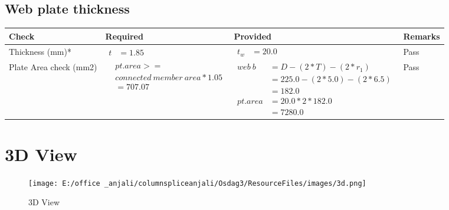 \documentclass{article}%
\begin{document}
\subsection{Web plate thickness}%
\label{subsec:Webplatethickness}%
\renewcommand{\arraystretch}{1.2}%
\begin{longtable}{|p{2.5cm}|p{4.5cm}|p{7cm}|p{1.5cm}|}%
\hline%
\rowcolor{OsdagGreen}%
Check&Required&Provided&Remarks\\%
\hline%
\endhead%
\hline%
Thickness (mm)*&$\begin{aligned} t &=1.85\end{aligned}$&$\begin{aligned} t_w &=20.0\end{aligned}$&Pass\\%
\hline%
Plate Area check (mm2)&$\begin{aligned} &pt.area >= \\&connected~member~area * 1.05\\  &= 707.07\end{aligned}$&$\begin{aligned} web~b &= D-(2*T)-(2*r_1)\\ &=225.0-(2*5.0)-(2*6.5)\\ &= 182.0 \\  pt.area &= 20.0*2* 182.0\\ &= 7280.0\end{aligned}$&Pass\\%
\hline%
\end{longtable}

%
%
\newpage%
\section{3D View}%
\label{sec:3DView}%


\begin{figure}[h!]%
\centering%
\texttt{[image: E:/office \_anjali/columnspliceanjali/Osdag3/ResourceFiles/images/3d.png]}%
\caption{3D View}%
\end{figure}

%
\end{document}
